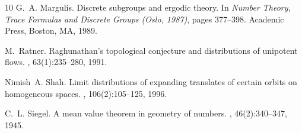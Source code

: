 \documentclass[reqno,11pt]{amsart}
\theoremstyle{definition}
\theoremstyle{remark}
\numberwithin{equation}{section}
\begin{document}
\begin{thebibliography}{10}
G.~A. Margulis.
\newblock Discrete subgroups and ergodic theory.
\newblock In {\em Number Theory, Trace Formulas and Discrete Groups ({O}slo, 1987)}, pages 377--398. Academic Press, Boston, MA, 1989.

M.~Ratner.
\newblock Raghunathan's topological conjecture and distributions of unipotent flows.
, 63(1):235--280, 1991.

Nimish~A. Shah.
\newblock Limit distributions of expanding translates of certain orbits on homogeneous spaces.
, 106(2):105--125, 1996.

C.~L. Siegel.
\newblock A mean value theorem in geometry of numbers.
, 46(2):340--347, 1945.

\end{thebibliography}
\end{document}
